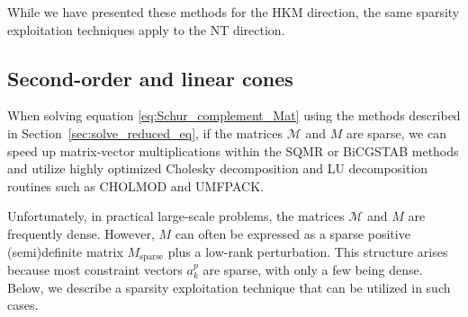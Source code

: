 While we have presented these methods for the HKM direction, the same sparsity exploitation techniques apply to the NT direction.


\subsection{Second-order and linear cones} \label{sec:exploit_sparsity_socp_lp}
When solving equation \eqref{eq:Schur_complement_Mat} using the methods described in Section~\ref{sec:solve_reduced_eq},
if the matrices $\mathcal{M}$ and $M$ are sparse, we can speed up matrix-vector multiplications within the SQMR or BiCGSTAB methods and utilize highly optimized Cholesky decomposition and LU decomposition routines such as CHOLMOD and UMFPACK.

Unfortunately, in practical large-scale problems, the matrices $\mathcal{M}$ and $M$ are frequently dense. 
However, $M$ can often be expressed as a sparse positive (semi)definite matrix $M_{\mathrm{sparse}}$ plus a low-rank perturbation.
This structure arises because most constraint vectors $a^p_k$ are sparse, with only a few being dense.
Below, we describe a sparsity exploitation technique that can be utilized in such cases.

